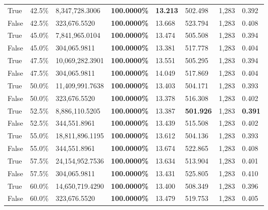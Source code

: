 \begin{table}[H]
\begin{tabular}{lllrllll}
\cline{1-8}
True & 42.5\% & 8,347,728.3006 & \bfseries \color{red} 100.0000\% & \bfseries \color{red} 13.213 & 502.498 & 1,283 & 0.392 \\
\cline{1-8}
False & 42.5\% & 323,676.5520 & \bfseries \color{red} 100.0000\% & 13.668 & 523.794 & 1,283 & 0.408 \\
\cline{1-8}
True & 45.0\% & 7,841,965.0104 & \bfseries \color{red} 100.0000\% & 13.474 & 505.508 & 1,283 & 0.394 \\
\cline{1-8}
False & 45.0\% & \color{red} 304,065.9811 & \bfseries \color{red} 100.0000\% & 13.381 & 517.778 & 1,283 & 0.404 \\
\cline{1-8}
True & 47.5\% & 10,069,282.3901 & \bfseries \color{red} 100.0000\% & 13.551 & 505.295 & 1,283 & 0.394 \\
\cline{1-8}
False & 47.5\% & \color{red} 304,065.9811 & \bfseries \color{red} 100.0000\% & 14.049 & 517.869 & 1,283 & 0.404 \\
\cline{1-8}
True & 50.0\% & 11,409,991.7638 & \bfseries \color{red} 100.0000\% & 13.403 & 504.171 & 1,283 & 0.393 \\
\cline{1-8}
False & 50.0\% & 323,676.5520 & \bfseries \color{red} 100.0000\% & 13.378 & 516.308 & 1,283 & 0.402 \\
\cline{1-8}
True & 52.5\% & 8,886,110.5205 & \bfseries \color{red} 100.0000\% & 13.387 & \bfseries \color{red} 501.926 & 1,283 & \bfseries \color{red} 0.391 \\
\cline{1-8}
False & 52.5\% & 344,551.8961 & \bfseries \color{red} 100.0000\% & 13.439 & 515.508 & 1,283 & 0.402 \\
\cline{1-8}
True & 55.0\% & 18,811,896.1195 & \bfseries \color{red} 100.0000\% & 13.612 & 504.136 & 1,283 & 0.393 \\
\cline{1-8}
False & 55.0\% & 344,551.8961 & \bfseries \color{red} 100.0000\% & 13.674 & 522.865 & 1,283 & 0.408 \\
\cline{1-8}
True & 57.5\% & 24,154,952.7536 & \bfseries \color{red} 100.0000\% & 13.634 & 513.904 & 1,283 & 0.401 \\
\cline{1-8}
False & 57.5\% & \color{red} 304,065.9811 & \bfseries \color{red} 100.0000\% & 13.431 & 525.805 & 1,283 & 0.410 \\
\cline{1-8}
True & 60.0\% & 14,650,719.4290 & \bfseries \color{red} 100.0000\% & 13.400 & 508.349 & 1,283 & 0.396 \\
\cline{1-8}
False & 60.0\% & 323,676.5520 & \bfseries \color{red} 100.0000\% & 13.479 & 519.753 & 1,283 & 0.405 \\
\cline{1-8}

\end{tabular}
\end{table}
